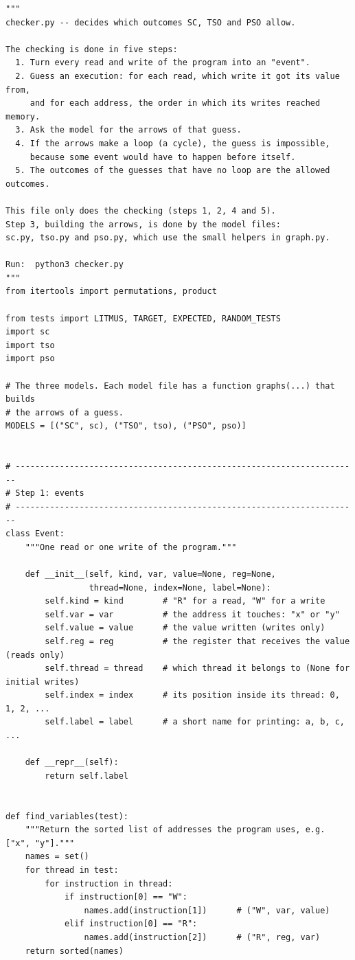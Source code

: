 \begin{lstlisting}[style=vspython]
"""
checker.py -- decides which outcomes SC, TSO and PSO allow.

The checking is done in five steps:
  1. Turn every read and write of the program into an "event".
  2. Guess an execution: for each read, which write it got its value from,
     and for each address, the order in which its writes reached memory.
  3. Ask the model for the arrows of that guess.
  4. If the arrows make a loop (a cycle), the guess is impossible,
     because some event would have to happen before itself.
  5. The outcomes of the guesses that have no loop are the allowed outcomes.

This file only does the checking (steps 1, 2, 4 and 5).
Step 3, building the arrows, is done by the model files:
sc.py, tso.py and pso.py, which use the small helpers in graph.py.

Run:  python3 checker.py
"""
from itertools import permutations, product

from tests import LITMUS, TARGET, EXPECTED, RANDOM_TESTS
import sc
import tso
import pso

# The three models. Each model file has a function graphs(...) that builds
# the arrows of a guess.
MODELS = [("SC", sc), ("TSO", tso), ("PSO", pso)]


# ----------------------------------------------------------------------
# Step 1: events
# ----------------------------------------------------------------------
class Event:
    """One read or one write of the program."""

    def __init__(self, kind, var, value=None, reg=None,
                 thread=None, index=None, label=None):
        self.kind = kind        # "R" for a read, "W" for a write
        self.var = var          # the address it touches: "x" or "y"
        self.value = value      # the value written (writes only)
        self.reg = reg          # the register that receives the value (reads only)
        self.thread = thread    # which thread it belongs to (None for initial writes)
        self.index = index      # its position inside its thread: 0, 1, 2, ...
        self.label = label      # a short name for printing: a, b, c, ...

    def __repr__(self):
        return self.label


def find_variables(test):
    """Return the sorted list of addresses the program uses, e.g. ["x", "y"]."""
    names = set()
    for thread in test:
        for instruction in thread:
            if instruction[0] == "W":
                names.add(instruction[1])      # ("W", var, value)
            elif instruction[0] == "R":
                names.add(instruction[2])      # ("R", reg, var)
    return sorted(names)



\end{lstlisting}
